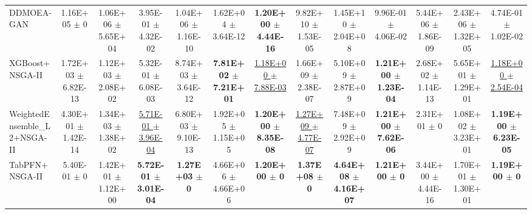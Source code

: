 \documentclass[conference]{IEEEtran}
\begin{document}
\begin{table}[htbp]
{\begin{tabular}{lcccccccccccc}
DDMOEA-GAN & 1.16E+05 $\pm$ 0 & 1.06E+06 $\pm$ 5.65E+04 & 3.95E-01 $\pm$ 4.32E-02 & 1.04E+06 $\pm$ 1.16E-10 & 1.62E+04 $\pm$ 3.64E-12 & \textbf{1.20E+00 $\pm$ 4.44E-16} & 9.82E+10 $\pm$ 1.53E-05 & 1.45E+10 $\pm$ 2.04E+08 & 9.96E-01 $\pm$ 4.06E-02 & 5.44E+06 $\pm$ 1.86E-09 & 2.43E+06 $\pm$ 1.32E+05 & 4.74E-01 $\pm$ 1.02E-02 \\
XGBoost+NSGA-II & 1.72E+03 $\pm$ 6.82E-13 & 1.12E+03 $\pm$ 2.08E+02 & 5.32E-01 $\pm$ 6.08E-03 & 8.74E+03 $\pm$ 3.64E-12 & \textbf{7.81E+02 $\pm$ 7.21E+01} & \underline{1.18E+00 $\pm$ 7.88E-03} & 1.66E+09 $\pm$ 2.38E-07 & 5.10E+09 $\pm$ 2.87E+09 & \textbf{1.21E+00 $\pm$ 1.23E-04} & 2.68E+02 $\pm$ 1.14E-13 & 5.65E+01 $\pm$ 1.29E+01 & \underline{1.18E+00 $\pm$ 2.54E-04} \\
WeightedEnsemble\_L2+NSGA-II & 4.30E+01 $\pm$ 1.42E-14 & 1.34E+03 $\pm$ 1.38E+02 & \underline{5.71E-01 $\pm$ 3.96E-04} & 6.80E+03 $\pm$ 9.10E-13 & 1.92E+05 $\pm$ 1.15E+05 & \textbf{1.20E+00 $\pm$ 8.35E-08} & \underline{1.27E+09 $\pm$ 4.77E-07} & 7.48E+09 $\pm$ 2.92E+09 & \textbf{1.21E+00 $\pm$ 7.62E-06} & 2.31E+01 $\pm$ 0 & 1.08E+02 $\pm$ 3.23E+01 & \textbf{1.19E+00 $\pm$ 6.23E-05} \\
TabPFN+NSGA-II & 5.40E-01 $\pm$ 0 & 1.42E+01 $\pm$ 1.12E+00 & \textbf{5.72E-01 $\pm$ 3.01E-04} & \textbf{1.27E+03 $\pm$ 0} & 4.66E+06 $\pm$ 4.66E+06 & \textbf{1.20E+00 $\pm$ 0} & \textbf{1.37E+08 $\pm$ 0} & \textbf{4.64E+08 $\pm$ 4.16E+07} & \textbf{1.21E+00 $\pm$ 0} & 3.44E+00 $\pm$ 4.44E-16 & 1.70E+01 $\pm$ 1.30E+01 & \textbf{1.19E+00 $\pm$ 0} \\
\bottomrule
\end{tabular}%
}
\end{table}
\end{document}
